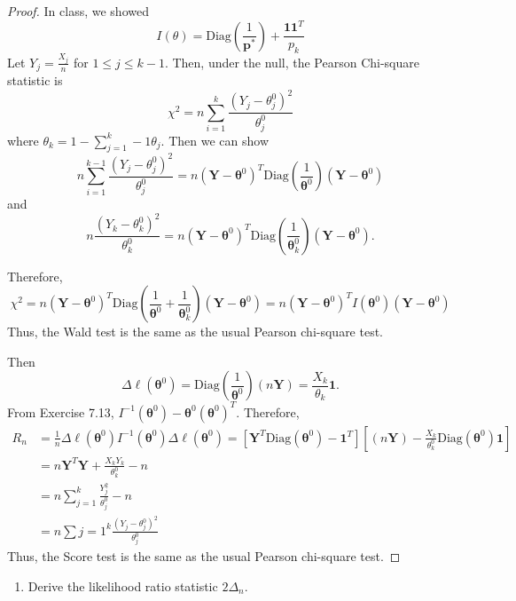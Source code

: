 \documentclass[12pt,]{article}
\providecommand{\tightlist}{%
  \setlength{\itemsep}{0pt}\setlength{\parskip}{0pt}}
\begin{document}
\begin{proof}

In class, we showed 
$$I(\theta)=\text{Diag}\left(\frac{1}{\boldsymbol p^*}\right)+\frac{\boldsymbol1\boldsymbol 1^T}{p_k}$$
Let $Y_j=\frac{X_j}{n}$ for $1\le j \le k - 1$. Then, under the null, the Pearson Chi-square statistic is
$$\chi^2=n\sum_{i=1}^k\frac{\left(Y_j-\theta_j^0\right)^2}{\theta_j^0}$$
where $\theta_k = 1-\sum_{j=1}^k-1\theta_j.$ Then we can show
$$n\sum_{i=1}^{k-1}\frac{\left(Y_j-\theta_j^0\right)^2}{\theta_j^0}=n\left(\boldsymbol Y-\boldsymbol \theta^0\right)^T\text{Diag}\left(\frac{1}{\boldsymbol \theta^0} \right)\left(\boldsymbol Y - \boldsymbol \theta^0\right)$$
and $$n\frac{\left(Y_k-\theta_k^0\right)^2}{\theta_k^0}=n\left(\boldsymbol Y-\boldsymbol \theta^0\right)^T\text{Diag}\left(\frac{1}{\boldsymbol \theta_k^0} \right)\left(\boldsymbol Y - \boldsymbol \theta^0\right).$$

Therefore,
$$\chi^2=n\left(\boldsymbol Y-\boldsymbol \theta^0\right)^T\text{Diag}\left(\frac{1}{\boldsymbol \theta^0} +\frac{1}{\boldsymbol \theta_k^0}\right)\left(\boldsymbol Y - \boldsymbol \theta^0\right)=n\left(\boldsymbol Y-\boldsymbol \theta^0\right)^TI(\boldsymbol \theta^0)\left(\boldsymbol Y - \boldsymbol \theta^0\right)$$
Thus, the Wald test is the same as the usual Pearson chi-square test.

Then
$$\Delta \ell(\boldsymbol \theta^0)=\text{Diag}\left(\frac{1}{\boldsymbol\theta^0}\right)(n\boldsymbol Y)=\frac{X_k}{\theta_k}\boldsymbol 1.$$
From Exercise 7.13, $I^{-1}(\boldsymbol \theta^0)-\boldsymbol \theta^0(\boldsymbol\theta^0)^T.$ Therefore,
\begin{align*}
R_n&=\frac{1}{n}\Delta\ell(\boldsymbol\theta^0)I^{-1}(\boldsymbol\theta^0)\Delta\ell(\boldsymbol\theta^0)=\left[\boldsymbol Y^T\text{Diag}(\boldsymbol\theta^0)-\boldsymbol 1^T\right]\left[(n\boldsymbol Y)-\frac{X_k}{\theta_k^0}\text{Diag}\left(\boldsymbol\theta^0\right)\boldsymbol 1\right]\\
&=n\boldsymbol Y^T\boldsymbol Y +\frac{X_kY_k}{\theta_k^0}-n\\
&=n\sum_{j=1}^k\frac{Y_j^2}{\theta_j^0}-n\\
&=n\sum{j=1}^k\frac{(Y_j-\theta_j^0)^2}{\theta_j^0}
\end{align*}
Thus, the Score test is the same as the usual Pearson chi-square test.
\end{proof}

\begin{enumerate}
\def\labelenumi{(\alph{enumi})}
\setcounter{enumi}{1}
\tightlist
\item
  Derive the likelihood ratio statistic \(2\Delta_n\).
\end{enumerate}
\end{document}
